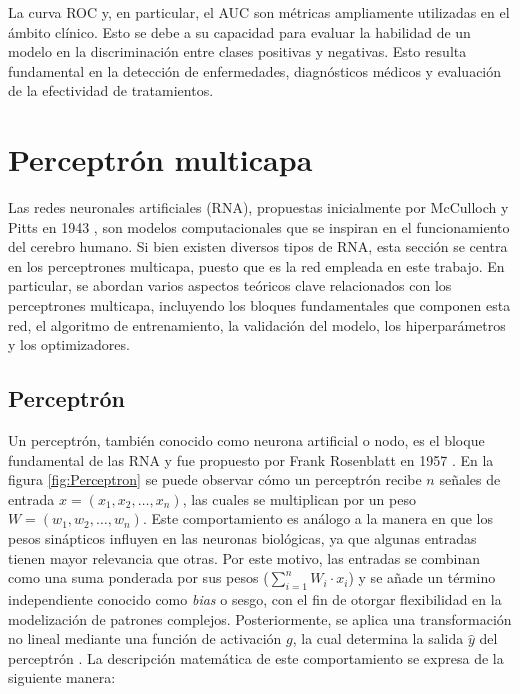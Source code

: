 La curva ROC y, en particular, el AUC son métricas ampliamente utilizadas en el ámbito clínico. 
Esto se debe a su capacidad para evaluar la habilidad de un modelo en la discriminación entre clases 
positivas y negativas. Esto resulta fundamental en la detección de enfermedades, diagnósticos médicos 
y evaluación de la efectividad de tratamientos.

\filbreak
\section{Perceptrón multicapa}
\label{sec:Perceptrón multicapa}


Las redes neuronales artificiales (RNA), propuestas inicialmente por McCulloch y Pitts en 1943 
\citep{CITE:41}, son modelos computacionales que se inspiran en el funcionamiento del cerebro 
humano. Si bien existen diversos tipos de RNA, esta sección se centra en los perceptrones 
multicapa, puesto que es la red empleada en este trabajo. En particular, se abordan varios 
aspectos teóricos clave relacionados con los perceptrones multicapa, incluyendo los bloques 
fundamentales que componen esta red, el algoritmo de entrenamiento, la validación del modelo, 
los hiperparámetros y los optimizadores.

\subsection{Perceptrón}
Un perceptrón, también conocido como neurona artificial o nodo, es el bloque fundamental de las 
RNA y fue propuesto por Frank Rosenblatt en 1957 \citep{CITE:43}. En la figura \ref{fig:Perceptron} se puede observar 
cómo un perceptrón recibe $n$ señales de entrada $x = (x_1, x_2, …, x_n)$, las cuales se multiplican 
por un peso $W = (w_1, w_2, …, w_n)$. Este comportamiento es análogo a la manera en que los 
pesos sinápticos influyen en las neuronas biológicas, ya que algunas entradas tienen mayor relevancia 
que otras. Por este motivo, las entradas se combinan como una suma ponderada por sus pesos 
($\sum_{i=1}^{n} W_i \cdot x_i$) y se añade un término independiente conocido como \emph{bias} o 
sesgo, con el fin de otorgar flexibilidad en la modelización de patrones complejos. 
Posteriormente, se aplica una transformación no lineal mediante una función de activación $g$, 
la cual determina la salida $\hat{y}$ del perceptrón \citep{CITE:35} \citep{CITE:42}. 
La descripción matemática de este comportamiento se expresa de la siguiente manera: 

